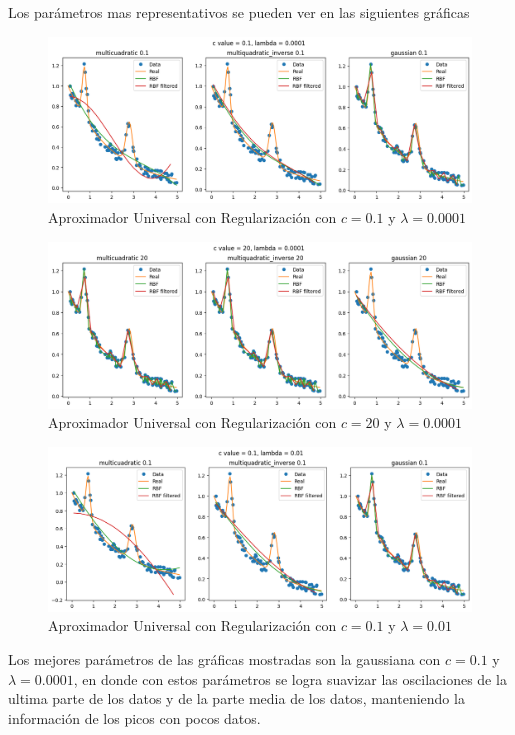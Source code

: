 \documentclass{article}
\theoremstyle{mytheoremstyle}
\theoremstyle{mytheoremstyle}
\theoremstyle{myproblemstyle}
\begin{document}
\begin{itemize}
        Los parámetros mas representativos se pueden ver en las siguientes gráficas

        \begin{figure}[!ht]
          \centering
          \includegraphics[width=1\textwidth, height=0.3\textwidth]{./imgs/AU/au_r1.png}
          \caption{Aproximador Universal con Regularización con $c=0.1$ y $\lambda=0.0001$}
          \label{fig:4}
        \end{figure}

        \begin{figure}[!ht]
          \centering
          \includegraphics[width=1\textwidth, height=0.3\textwidth]{./imgs/AU/au_r2.png}
          \caption{Aproximador Universal con Regularización con $c=20$ y $\lambda=0.0001$}
          \label{fig:5}
        \end{figure}

        \begin{figure}[!ht]
          \centering
          \includegraphics[width=1\textwidth, height=0.3\textwidth]{./imgs/AU/au_r3.png}
          \caption{Aproximador Universal con Regularización con $c=0.1$ y $\lambda=0.01$}
          \label{fig:6}
        \end{figure}

        Los mejores parámetros de las gráficas mostradas son la gaussiana con $c=0.1$ y $\lambda=0.0001$, en donde con estos parámetros se logra suavizar las  oscilaciones de la ultima parte de los datos y de la parte media de los datos, manteniendo la información de los picos con pocos datos.


\end{itemize}
\end{document}
